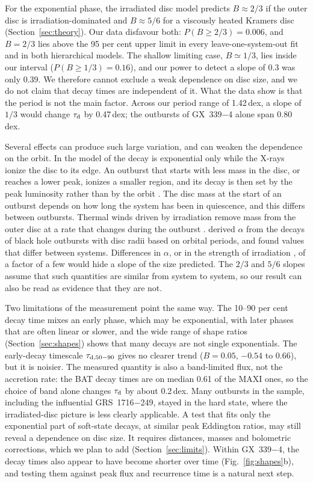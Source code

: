 \documentclass[fleqn,usenatbib]{mnras}
\newcommand{\taud}{\tau_{\rm d}}
\newcommand{\dex}{\,dex}
\begin{document}
For the exponential phase, the irradiated disc model predicts $B\approx2/3$ if the outer disc is irradiation-dominated and $B\approx5/6$ for a viscously heated Kramers disc (Section~\ref{sec:theory}). Our data disfavour both: $P(B\ge2/3)=0.006$, and $B=2/3$ lies above the 95 per cent upper limit in every leave-one-system-out fit and in both hierarchical models. The shallow limiting case, $B\simeq1/3$, lies inside our interval ($P(B\ge1/3)=0.16$), and our power to detect a slope of 0.3 was only 0.39. We therefore cannot exclude a weak dependence on disc size, and we do not claim that decay times are independent of it. What the data show is that the period is not the main factor. Across our period range of 1.42\dex, a slope of $1/3$ would change $\taud$ by 0.47\dex; the outbursts of GX~339$-$4 alone span 0.80\dex.

Several effects can produce such large variation, and can weaken the dependence on the orbit. In the model of \citet{KingRitter1998} the decay is exponential only while the X-rays ionize the disc to its edge. An outburst that starts with less mass in the disc, or reaches a lower peak, ionizes a smaller region, and its decay is then set by the peak luminosity rather than by the orbit \citep{Shahbaz1998}. The disc mass at the start of an outburst depends on how long the system has been in quiescence, and this differs between outbursts. Thermal winds driven by irradiation remove mass from the outer disc at a rate that changes during the outburst \citep{Tetarenko2018a,Dubus2019}. \citet{Tetarenko2018a} derived $\alpha$ from the decays of black hole outbursts with disc radii based on orbital periods, and found values that differ between systems. Differences in $\alpha$, or in the strength of irradiation \citep{Tetarenko2018b}, of a factor of a few would hide a slope of the size predicted. The $2/3$ and $5/6$ slopes assume that such quantities are similar from system to system, so our result can also be read as evidence that they are not.

Two limitations of the measurement point the same way. The 10--90 per cent decay time mixes an early phase, which may be exponential, with later phases that are often linear or slower, and the wide range of shape ratios (Section~\ref{sec:shapes}) shows that many decays are not single exponentials. The early-decay timescale $\tau_{\rm d,50-90}$ gives no clearer trend ($B=0.05$, $-0.54$ to $0.66$), but it is noisier. The measured quantity is also a band-limited flux, not the accretion rate: the BAT decay times are on median 0.61 of the MAXI ones, so the choice of band alone changes $\taud$ by about 0.2\dex. Many outbursts in the sample, including the influential GRS~1716$-$249, stayed in the hard state, where the irradiated-disc picture is less clearly applicable. A test that fits only the exponential part of soft-state decays, at similar peak Eddington ratios, may still reveal a dependence on disc size. It requires distances, masses and bolometric corrections, which we plan to add (Section~\ref{sec:limits}). Within GX~339$-$4, the decay times also appear to have become shorter over time (Fig.~\ref{fig:shapes}b), and testing them against peak flux and recurrence time is a natural next step.
\end{document}
